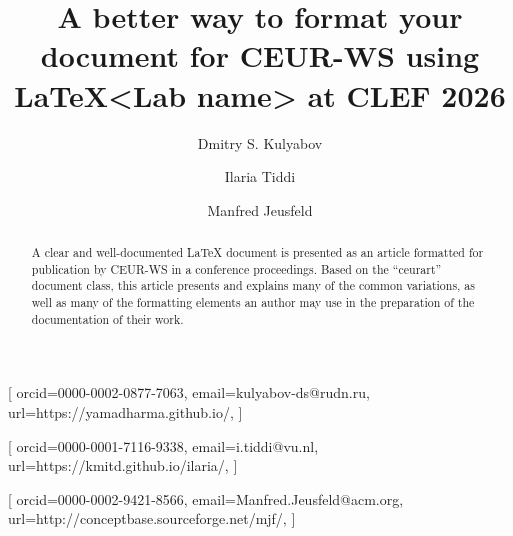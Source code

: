 \documentclass[
]{ceurart}
\begin{document}


\title{A better way to format your document for CEUR-WS using LaTeX}

\title[mode=sub]{<Lab name> at CLEF 2026}


\tnotemark[1]

\author[1,2]{Dmitry S. Kulyabov}[%
orcid=0000-0002-0877-7063,
email=kulyabov-ds@rudn.ru,
url=https://yamadharma.github.io/,
]
\cormark[1]
\fnmark[1]
\address[1]{Peoples' Friendship University of Russia (RUDN University),
  6 Miklukho-Maklaya St, Moscow, 117198, Russian Federation}
\address[2]{Joint Institute for Nuclear Research,
  6 Joliot-Curie, Dubna, Moscow region, 141980, Russian Federation}

\author[3]{Ilaria Tiddi}[%
orcid=0000-0001-7116-9338,
email=i.tiddi@vu.nl,
url=https://kmitd.github.io/ilaria/,
]
\fnmark[1]
\address[3]{Vrije Universiteit Amsterdam, De Boelelaan 1105, 1081 HV Amsterdam, The Netherlands}

\author[4]{Manfred Jeusfeld}[%
orcid=0000-0002-9421-8566,
email=Manfred.Jeusfeld@acm.org,
url=http://conceptbase.sourceforge.net/mjf/,
]
\fnmark[1]
\address[4]{University of Skövde, Högskolevägen 1, 541 28 Skövde, Sweden}


\begin{abstract}
  A clear and well-documented \LaTeX{} document is presented as an
  article formatted for publication by CEUR-WS in a conference
  proceedings. Based on the ``ceurart'' document class, this article
  presents and explains many of the common variations, as well as many
  of the formatting elements an author may use in the preparation of
  the documentation of their work.
\end{abstract}
\end{document}
